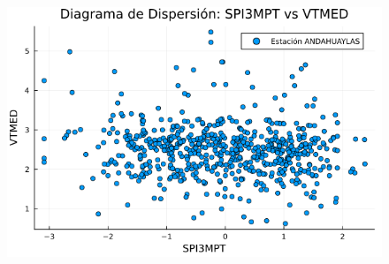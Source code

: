 \begin{figure}[H]
\begin{minipage}{0.33\textwidth}
    \includegraphics[width=\linewidth]{Capitulos/Scaterplot/ANDAHUAYLAS_SPI3MPT_vs_VTMED.png}
\end{minipage}

\vspace{0.3cm}  %


\end{figure}
